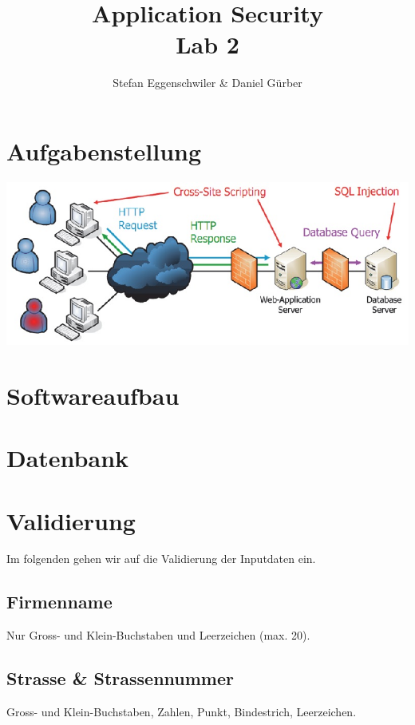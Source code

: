 \documentclass[12pt]{scrartcl}
\author{Stefan Eggenschwiler \& Daniel Gürber}
\title{ %
Application Security
\\Lab 2
\vspace{0.2cm}
}
\begin{document}
 \maketitle
 \thispagestyle{firststyle}
 \pagestyle{firststyle}
 \begin{abstract}
 \begin{center}
 \end{center}
 \vspace{0.5cm}
\hrulefill
\end{abstract}

 \pagestyle{documentstyle}
 \tableofcontents
 \pagebreak
\section{Aufgabenstellung}
\includegraphics[scale=0.5]{./aufgabenstellung.jpg}

\section{Softwareaufbau}


\section{Datenbank}


\section{Validierung}
Im folgenden gehen wir auf die Validierung der Inputdaten ein.

\subsection{Firmenname}
Nur Gross- und Klein-Buchstaben und Leerzeichen (max. 20).

\subsection{Strasse \& Strassennummer}
Gross- und Klein-Buchstaben, Zahlen, Punkt, Bindestrich, Leerzeichen.
\end{document}
